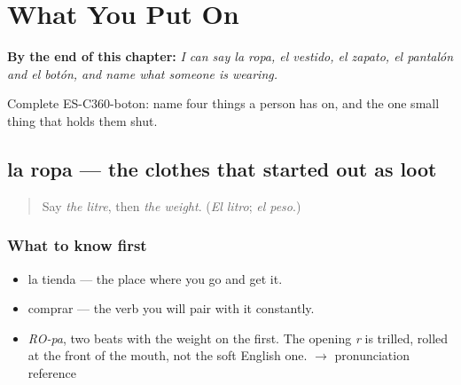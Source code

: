 
\chapter{What You Put On}
\label{ch:la-ropa-y-el-zapato}

\begin{chapteropening}
\textbf{By the end of this chapter:} \emph{I can say la ropa, el vestido, el zapato, el pantalón and el botón, and name what someone is wearing.}

Complete ES-C360-boton: name four things a person has on, and the one small thing that holds them shut.
\end{chapteropening}

\section[la ropa]{la ropa — the clothes that started out as loot}

\label{lesson:ES-C360-ropa}



\begin{quote}
Say \emph{the litre}, then \emph{the weight}. (\emph{El litro}; \emph{el peso}.)
\end{quote}

\subsection*{What to know first}
\begin{itemize}
\raggedright
  \item la tienda — the place where you go and get it.
  \item comprar — the verb you will pair with it constantly.
\end{itemize}

\begin{sounds}
\begin{itemize}
\raggedright
  \item \emph{RO-pa}, two beats with the weight on the first. The opening \emph{r} is trilled, rolled at the front of the mouth, not the soft English one. $\to$ pronunciation reference
\end{itemize}
\end{sounds}

